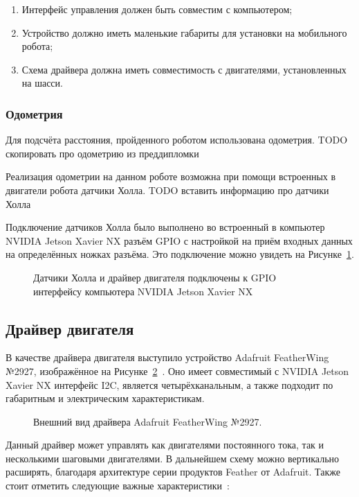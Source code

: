 \begin{enumerate}[beginpenalty=10000] %
  \item Интерфейс управления должен быть совместим с компьютером;
  \item Устройство должно иметь маленькие габариты для установки на мобильного робота;
  \item Схема драйвера должна иметь совместимость с двигателями, установленных на шасси.
\end{enumerate}

\subsubsection{Одометрия}
Для подсчёта расстояния, пройденного роботом использована одометрия. TODO скопировать про одометрию из преддипломки

Реализация одометрии на данном роботе возможна при помощи встроенных в двигатели робота датчики Холла. TODO вставить информацию про датчики Холла

Подключение датчиков Холла было выполнено во встроенный в компьютер NVIDIA Jetson Xavier NX разъём GPIO с настройкой на приём входных данных на определённых ножках разъёма. Это подключение можно увидеть на Рисунке~\cref{fig:gpio-wire}.

\begin{figure}[ht]
    \caption{Датчики Холла и драйвер двигателя подключены к GPIO интерфейсу компьютера NVIDIA Jetson Xavier NX}\label{fig:gpio-wire}
\end{figure}

\subsection{Драйвер двигателя}
В качестве драйвера двигателя выступило устройство Adafruit FeatherWing №2927, изображённое на Рисунке~\cref{fig:adafruit}~\cite{adafruit}. Оно имеет совместимый с NVIDIA Jetson Xavier NX интерфейс I2C, является четырёхканальным, а также подходит по габаритным и электрическим характеристикам.

\begin{figure}[ht]
    \caption{Внешний вид драйвера Adafruit FeatherWing №2927.}\label{fig:adafruit}
\end{figure}

Данный драйвер может управлять как двигателями постоянного тока, так и несколькими шаговыми двигателями. В дальнейшем схему можно вертикально расширять, благодаря архитектуре серии продуктов Feather от Adafruit. Также стоит отметить следующие важные характеристики~\cite{adafruit}:

